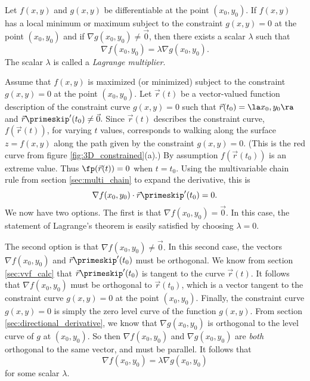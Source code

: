 
{Let $f(x,y)$ and $g(x,y)$ be differentiable at the point $(x_0,y_0)$.  If $f(x,y)$ has a local minimum or maximum subject to the constraint $g(x,y)=0$ at the point $(x_0,y_0)$ and if $\nabla g(x_0,y_0) \neq \vec{0}$, then there exists a scalar $\lambda$ such that
	\[
		\nabla f(x_0,y_0) = \lambda \nabla g(x_0,y_0).
	\]
The scalar $\lambda$ is called a \emph{Lagrange multiplier}. 
}

{Assume that $f(x,y)$ is maximized (or minimized) subject to the constraint $g(x,y)=0$ at the point $(x_0,y_0)$.  Let $\vec{r}(t)$ be a vector-valued function description of the constraint curve $g(x,y)=0$ such that $\vec{r}(t_0)=\la x_0,y_0 \ra$ and $\vec{r}\primeskip ^\prime(t_0) \neq \vec{0}.$  Since $\vec{r}(t)$ describes the constraint curve, $f(\vec{r}(t))$, for varying $t$ values, corresponds to walking along the surface $z=f(x,y)$ along the path given by the constraint $g(x,y)=0$. (This is the red curve from figure \ref{fig:3D_constrained}(a).) By assumption $f(\vec{r}(t_0))$ is an extreme value.  Thus $\fp(\vec{r}(t)) = 0$ when $t = t_0$.  Using the multivariable chain rule from section \ref{sec:multi_chain} to expand the derivative, this is
	\[
		\nabla f(x_0,y_0) \cdot \vec{r}\primeskip^\prime(t_0)=0.
	\]
We now have two options. The first is that $\nabla f(x_0,y_0) = \vec{0}.$  In this case, the statement of Lagrange's theorem is easily satisfied by choosing $\lambda = 0.$

The second option is that $\nabla f(x_0,y_0) \neq \vec{0}.$ In this second case, the vectors $\nabla f(x_0,y_0)$ and $\vec{r}\primeskip^\prime(t_0)$ must be orthogonal.  We know from section \ref{sec:vvf_calc} that $\vec{r}\primeskip^\prime(t_0)$ is tangent to the curve $\vec{r}(t)$.  It follows that $\nabla f(x_0,y_0)$ must be orthogonal to $\vec{r}(t_0)$, which is a vector tangent to the constraint curve $g(x,y)=0$ at the point $(x_0,y_0)$. Finally, the constraint curve $g(x,y)=0$ is simply the zero level curve of the function $g(x,y)$.  From section \ref{sec:directional_derivative}, we know that $\nabla g(x_0,y_0)$ is orthogonal to the level curve of $g$ at $(x_0,y_0)$. So then $\nabla f(x_0,y_0)$ and $\nabla g(x_0,y_0)$ are \emph{both} orthogonal to the same vector, and must be parallel.  It follows that
	\[
		\nabla f(x_0,y_0) = \lambda \nabla g(x_0,y_0)
	\] 
for some scalar $\lambda$.
}

